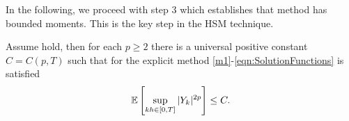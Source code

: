 In the following, we proceed with step 3 which establishes that \SM method has bounded moments. 
This is  the key step in the HSM technique.


\begin{lem}\label{lem:SSSMMomentBounds}
	Assume  hold, then for each $p\geq 2$ there is 
	a universal positive constant 
	$C=C(p,T)$ 
	such that for the explicit \SM method \eqref{m1}-\eqref{eqn:SolutionFunctions} is satisfied
	\begin{equation*}
		\mathbb{E}\left[
		\sup_{kh \in [0,T]}
		|Y_k|^{2p}
		\right]\leq C.
	\end{equation*}
\end{lem}
